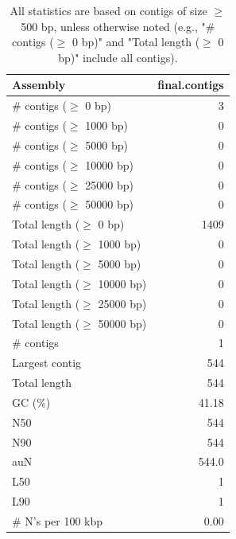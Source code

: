 \documentclass[12pt,a4paper]{article}
\begin{document}
\begin{table}[ht]
\begin{center}
\caption{All statistics are based on contigs of size $\geq$ 500 bp, unless otherwise noted (e.g., "\# contigs ($\geq$ 0 bp)" and "Total length ($\geq$ 0 bp)" include all contigs).}
\begin{tabular}{|l*{1}{|r}|}
\hline
Assembly & final.contigs \\ \hline
\# contigs ($\geq$ 0 bp) & 3 \\ \hline
\# contigs ($\geq$ 1000 bp) & 0 \\ \hline
\# contigs ($\geq$ 5000 bp) & 0 \\ \hline
\# contigs ($\geq$ 10000 bp) & 0 \\ \hline
\# contigs ($\geq$ 25000 bp) & 0 \\ \hline
\# contigs ($\geq$ 50000 bp) & 0 \\ \hline
Total length ($\geq$ 0 bp) & 1409 \\ \hline
Total length ($\geq$ 1000 bp) & 0 \\ \hline
Total length ($\geq$ 5000 bp) & 0 \\ \hline
Total length ($\geq$ 10000 bp) & 0 \\ \hline
Total length ($\geq$ 25000 bp) & 0 \\ \hline
Total length ($\geq$ 50000 bp) & 0 \\ \hline
\# contigs & 1 \\ \hline
Largest contig & 544 \\ \hline
Total length & 544 \\ \hline
GC (\%) & 41.18 \\ \hline
N50 & 544 \\ \hline
N90 & 544 \\ \hline
auN & 544.0 \\ \hline
L50 & 1 \\ \hline
L90 & 1 \\ \hline
\# N's per 100 kbp & 0.00 \\ \hline
\end{tabular}
\end{center}
\end{table}
\end{document}
